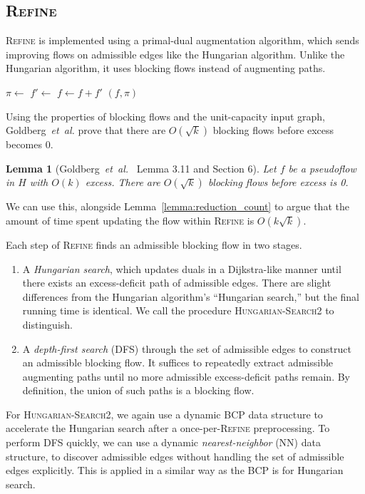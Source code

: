 \documentclass[11pt]{article}
\def\etal{\textsl{et~al.}}
\theoremstyle{plain}
\newtheorem{lemma}{Lemma}
\begin{document}
\begin{figure*}
\subsection{\textsc{Refine}}

\textsc{Refine} is implemented using a primal-dual augmentation algorithm,
which sends improving flows on admissible edges like the Hungarian algorithm.
Unlike the Hungarian algorithm, it uses blocking flows instead of augmenting
paths.

\begin{algorithm}
\caption{Refinement}
\begin{algorithmic}[1]
		\State $\pi \gets$ 
		\State $f' \gets$ 
		\State $f \gets f + f'$
	\EndWhile
	\State\Return $(f, \pi)$
\EndFunction
\end{algorithmic}
\end{algorithm}

Using the properties of blocking flows and the unit-capacity input graph,
Goldberg~{\etal} prove that there are $O(\sqrt{k})$ blocking flows before
excess becomes 0.

\begin{lemma}[Goldberg~{\etal}~\cite{GHKT17} Lemma 3.11 and Section 6]
Let $f$ be a pseudoflow in $H$ with $O(k)$ excess.
There are $O(\sqrt{k})$ blocking flows before excess is 0.
\end{lemma}

We can use this, alongside Lemma~\ref{lemma:reduction_count} to argue that the
amount of time spent updating the flow within \textsc{Refine} is
$O(k\sqrt{k})$.

Each step of \textsc{Refine} finds an admissible blocking flow in two stages.
\begin{enumerate}
\item A \emph{Hungarian search}, which updates duals in a Dijkstra-like
	manner until there exists an excess-deficit path of admissible edges.
	There are slight differences from the Hungarian algorithm's ``Hungarian
	search,'' but the final running time is identical.
	We call the procedure \textsc{Hungarian-Search2} to distinguish.

\item A \emph{depth-first search} (\textsc{DFS}) through the set of admissible
	edges to construct an admissible blocking flow.
	It suffices to repeatedly extract admissible augmenting paths until
	no more admissible excess-deficit paths remain.
	By definition, the union of such paths is a blocking flow.
\end{enumerate}
For \textsc{Hungarian-Search2}, we again use a dynamic BCP data structure to
accelerate the Hungarian search after a once-per-\textsc{Refine} preprocessing.
To perform \textsc{DFS} quickly, we can use a dynamic \emph{nearest-neighbor}
(NN) data structure, to discover admissible edges without handling the set of
admissible edges explicitly.
This is applied in a similar way as the BCP is for Hungarian search.


\end{figure*}
\end{document}
